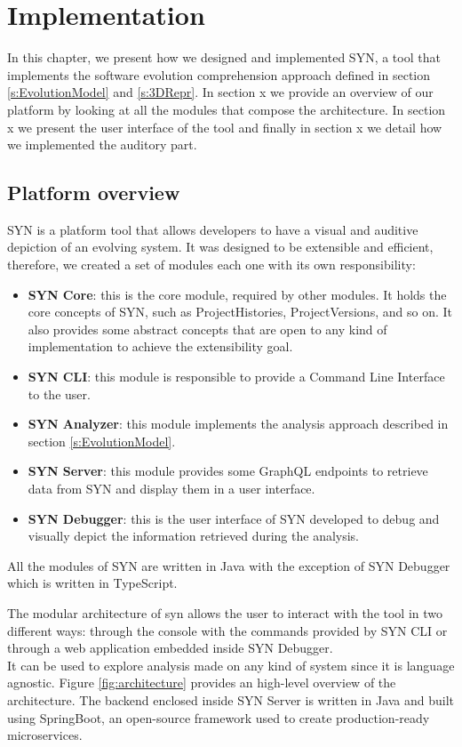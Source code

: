 
\chapter[Implementation]{Implementation}
\graphicspath{ {images/implementation} }
In this chapter, we present how we designed and implemented SYN, a tool that implements the software evolution comprehension approach 
defined in section \ref{s:EvolutionModel} and \ref{s:3DRepr}. 
In section x we provide an overview of our platform by looking at all the modules that compose the architecture. 
In section x we present the user interface of the tool and finally in section x we detail how we implemented the auditory part. 


\section{Platform overview}

SYN is a platform tool that allows developers to have a visual and auditive depiction of an evolving system. 
It was designed to be extensible and efficient, therefore, we created a set of modules each one with its own responsibility:
\begin{itemize}
    \item \textbf{SYN Core}: this is the core module, required by other modules. It holds the core concepts of SYN, such as ProjectHistories, ProjectVersions, and so on. It also provides some abstract concepts that are open to any kind of implementation to achieve the extensibility goal.
    \item \textbf{SYN CLI}: this module is responsible to provide a Command Line Interface to the user.
    \item \textbf{SYN Analyzer}: this module implements the analysis approach described in section \ref{s:EvolutionModel}. 
    \item \textbf{SYN Server}: this module provides some GraphQL endpoints to retrieve data from SYN and display them in a user interface. 
    \item \textbf{SYN Debugger}: this is the user interface of SYN developed to debug and visually depict the information retrieved during the analysis. 
\end{itemize}

All the modules of SYN are written in Java with the exception of SYN Debugger which is written in TypeScript. 

The modular architecture of syn allows the user to interact with the tool in two different ways: through the console with the commands provided by SYN CLI or through a web application embedded inside SYN Debugger. \\
It can be used to explore analysis made on any kind of system since it is language agnostic. Figure \ref{fig:architecture} provides an high-level overview of the architecture. 
The backend enclosed inside SYN Server is written in Java and built using SpringBoot, an open-source framework used to create production-ready microservices.  


